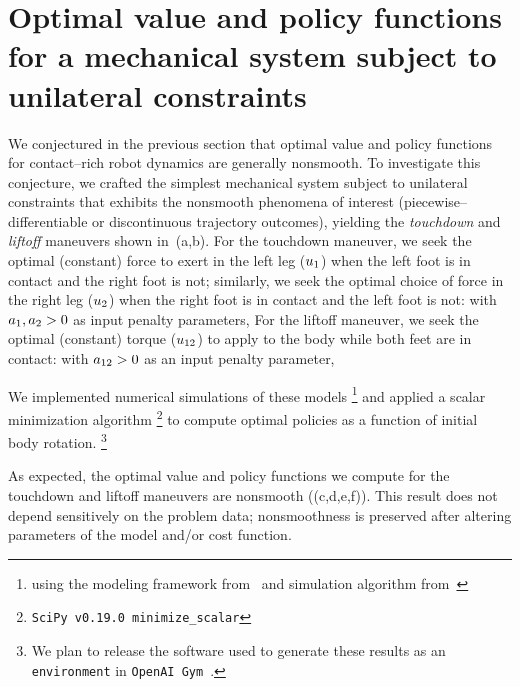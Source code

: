 \documentclass{article}
\begin{document}

\section{Optimal value and policy functions for a mechanical system subject to unilateral constraints}
\label{sec:opt}
We conjectured in the previous section that optimal value and policy functions for contact--rich robot dynamics are generally nonsmooth.
To investigate this conjecture, we crafted the simplest mechanical system subject to unilateral constraints that exhibits the nonsmooth phenomena of interest
(piecewise--differentiable or discontinuous trajectory outcomes), yielding the \emph{touchdown} and \emph{liftoff} maneuvers shown in~(a,b).
%
For the touchdown maneuver, we seek the optimal (constant) force to exert in the left leg ($u_{1}$) when the left foot is in contact and the right foot is not; similarly, we seek the optimal choice of force in the right leg ($u_{2}$) when the right foot is in contact and the left foot is not: with $a_{1},a_{2} > 0$ as input penalty parameters,
%
For the liftoff maneuver, we seek the optimal (constant) torque ($u_{12}$) to apply to the body while both feet are in contact: with $a_{12} > 0$ as an input penalty parameter,

%
We implemented numerical simulations of these models%
\footnote{using the modeling framework from~\cite{Johnson2016-nh} and simulation algorithm from~\cite{Burden2015-ip}}
and applied a scalar minimization algorithm%
\footnote{{\tt SciPy v0.19.0 minimize\_scalar}}
to compute optimal policies as a function of initial body rotation.%
\footnote{We plan to release the software used to generate these results as an {\tt environment} in {\tt OpenAI Gym}~\cite{Brockman2016-wq}.}

As expected, the optimal value and policy functions we compute for the touchdown and liftoff maneuvers are nonsmooth ((c,d,e,f)).
This result does not depend sensitively on the problem data;
nonsmoothness is preserved after altering parameters of the model and/or cost function.
\end{document}

